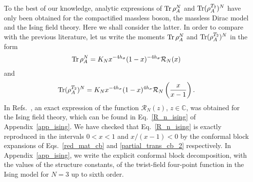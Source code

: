 \documentclass[a4paper,11pt]{article}
\def\Tr{\mathop{\mbox{\normalfont Tr}}\nolimits}
\begin{document}
To the best of our knowledge, analytic expressions of $\Tr\rho_A^N$ and $\Tr(\rho_A^{T_2})^N$ have  
only been obtained for the compactified massless boson, the massless Dirac 
model and the Ising field theory. Here we shall consider the latter. In order 
to compare with the previous literature, let us write the moments $\Tr\rho_A^N$ 
and $\Tr(\rho_A^{T_2})^N$ in the form~\cite{Calabrese09}
\begin{equation}\label{F_n_cc}
\Tr\rho_A^N=K_Nx^{-4h_\sigma}(1-x)^{-4h_\sigma}\mathcal{R}_N(x)
\end{equation}
and~\cite{CalabreseNeg}
\begin{equation}\label{G_n_cc}
 \Tr(\rho_A^{T_2})^N=K_N x^{-4h_\sigma}(1-x)^{4h_\sigma}\mathcal{R}_N\left(\frac{x}{x-1}\right).
\end{equation}
In Refs.~\cite{Calabrese11, Tagliacozzo}, an exact expression of the function
$\mathcal{R}_N(z)$, $z\in\mathbb{C}$, was obtained for the Ising field theory, 
which can be found in Eq.~\eqref{R_n_ising} of Appendix~\ref{app_ising}. 
We have checked that Eq.~\eqref{R_n_ising} is exactly reproduced in the intervals $0<x<1$ and $x/(x-1)<0$ by the 
conformal block expansions of Eqs.~\eqref{red_mat_cb} and \eqref{partial_trans_cb_2} 
respectively. In Appendix~\ref{app_ising}, we write the explicit 
conformal block decomposition, with the values of the structure constants, 
of the twist-field four-point function in the Ising model for $N=3$ up to sixth order. 
\end{document}
